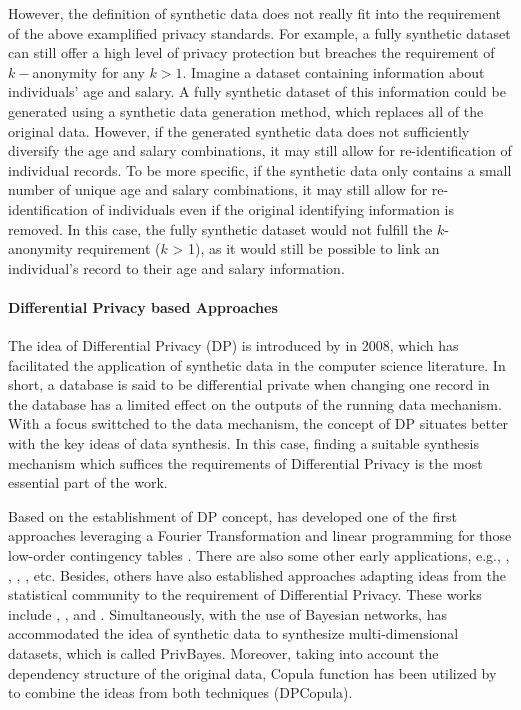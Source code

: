 However, the definition of synthetic data does not really fit into the requirement of the above examplified privacy standards. For example, a fully synthetic dataset can still offer a high level of privacy protection but breaches the requirement of $k-$anonymity for any $k>1$. Imagine a dataset containing information about individuals' age and salary. A fully synthetic dataset of this information could be generated using a synthetic data generation method, which replaces all of the original data. However, if the generated synthetic data does not sufficiently diversify the age and salary combinations, it may still allow for re-identification of individual records. To be more specific, if the synthetic data only contains a small number of unique age and salary combinations, it may still allow for re-identification of individuals even if the original identifying information is removed. In this case, the fully synthetic dataset would not fulfill the $k$-anonymity requirement ($k$ > 1), as it would still be possible to link an individual's record to their age and salary information.

\paragraph{Differential Privacy based Approaches}
The idea of Differential Privacy (DP) is introduced by \citet{dwork2008differential} in 2008, which has facilitated the application of
synthetic data in the computer science literature. In short, a database is said to be differential private when changing one
record in the database has a limited effect on the outputs of the running data mechanism. With a focus swittched to the data mechanism, 
the concept of DP situates better with the key ideas of data synthesis. In this case, finding a suitable synthesis mechanism which suffices
the requirements of Differential Privacy is the most essential part of the work. 


Based on the establishment of DP concept, \citet{barak2007privacy} has developed one of the first approaches leveraging a Fourier Transformation
and linear programming for those low-order contingency tables \citep{dwork2008differential}. There are also some other early applications, e.g., \citep{eno2008generating},
\citep{cano2010evaluation}, \citep{blum2013learning}, \citep{xiao2010differential}, etc. Besides, others have also established approaches adapting
ideas from the statistical community to the requirement of Differential Privacy. These works include \citep{abowd2008protective}, 
\citep{machanavajjhala2008privacy}, \citep{charest2011can} and \citep{mcclure2012differential}. Simultaneously, with the use of Bayesian networks, 
\citep{zhang2017privbayes} has accommodated the idea of synthetic data to synthesize multi-dimensional datasets, which is called PrivBayes. Moreover,
taking into account the dependency structure of the original data, Copula function has been utilized by \citet{li2014differentially} to combine the ideas from both techniques (DPCopula).

